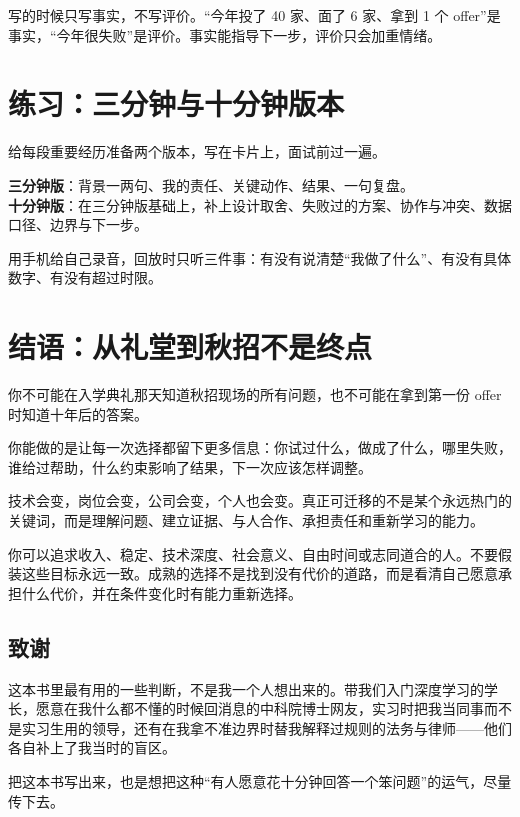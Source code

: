 \documentclass[UTF8,zihao=5,openany]{ctexbook}
\newif\ifbookappendix
\let\bookorigappendix\appendix
\renewcommand{\appendix}{\bookorigappendix\bookappendixtrue}
\begin{document}
写的时候只写事实，不写评价。“今年投了 40 家、面了 6 家、拿到 1 个 offer”是事实，“今年很失败”是评价。事实能指导下一步，评价只会加重情绪。


\clearpage\section{练习：三分钟与十分钟版本}
给每段重要经历准备两个版本，写在卡片上，面试前过一遍。

\begin{toolbox}
\textbf{三分钟版}：背景一两句、我的责任、关键动作、结果、一句复盘。\\[2pt]
\textbf{十分钟版}：在三分钟版基础上，补上设计取舍、失败过的方案、协作与冲突、数据口径、边界与下一步。

\smallskip
用手机给自己录音，回放时只听三件事：有没有说清楚“我做了什么”、有没有具体数字、有没有超过时限。
\end{toolbox}


\section{结语：从礼堂到秋招不是终点}
你不可能在入学典礼那天知道秋招现场的所有问题，也不可能在拿到第一份 offer 时知道十年后的答案。

你能做的是让每一次选择都留下更多信息：你试过什么，做成了什么，哪里失败，谁给过帮助，什么约束影响了结果，下一次应该怎样调整。

技术会变，岗位会变，公司会变，个人也会变。真正可迁移的不是某个永远热门的关键词，而是理解问题、建立证据、与人合作、承担责任和重新学习的能力。

你可以追求收入、稳定、技术深度、社会意义、自由时间或志同道合的人。不要假装这些目标永远一致。成熟的选择不是找到没有代价的道路，而是看清自己愿意承担什么代价，并在条件变化时有能力重新选择。

\subsection*{致谢}
这本书里最有用的一些判断，不是我一个人想出来的。带我们入门深度学习的学长，愿意在我什么都不懂的时候回消息的中科院博士网友，实习时把我当同事而不是实习生用的领导，还有在我拿不准边界时替我解释过规则的法务与律师——他们各自补上了我当时的盲区。

把这本书写出来，也是想把这种“有人愿意花十分钟回答一个笨问题”的运气，尽量传下去。

\appendix
\end{document}
